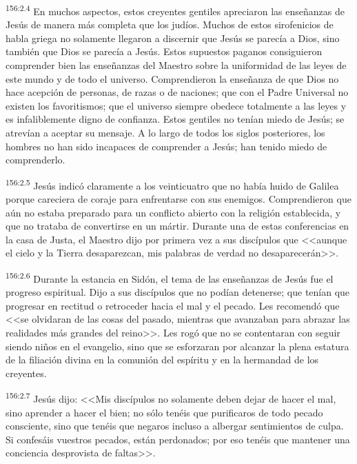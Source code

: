 \par 
\textsuperscript{156:2.4} En muchos aspectos, estos creyentes gentiles apreciaron las enseñanzas de Jesús de manera más completa que los judíos. Muchos de estos sirofenicios de habla griega no solamente llegaron a discernir que Jesús se parecía a Dios, sino también que Dios se parecía a Jesús. Estos supuestos paganos consiguieron comprender bien las enseñanzas del Maestro sobre la uniformidad de las leyes de este mundo y de todo el universo. Comprendieron la enseñanza de que Dios no hace acepción de personas, de razas o de naciones; que con el Padre Universal no existen los favoritismos; que el universo siempre obedece totalmente a las leyes y es infaliblemente digno de confianza. Estos gentiles no tenían miedo de Jesús; se atrevían a aceptar su mensaje. A lo largo de todos los siglos posteriores, los hombres no han sido incapaces de comprender a Jesús; han tenido miedo de comprenderlo.

\par 
\textsuperscript{156:2.5} Jesús indicó claramente a los veinticuatro que no había huido de Galilea porque careciera de coraje para enfrentarse con sus enemigos. Comprendieron que aún no estaba preparado para un conflicto abierto con la religión establecida, y que no trataba de convertirse en un mártir. Durante una de estas conferencias en la casa de Justa, el Maestro dijo por primera vez a sus discípulos que <<aunque el cielo y la Tierra desaparezcan, mis palabras de verdad no desaparecerán>>.

\par 
\textsuperscript{156:2.6} Durante la estancia en Sidón, el tema de las enseñanzas de Jesús fue el progreso espiritual. Dijo a sus discípulos que no podían detenerse; que tenían que progresar en rectitud o retroceder hacia el mal y el pecado. Les recomendó que <<se olvidaran de las cosas del pasado, mientras que avanzaban para abrazar las realidades más grandes del reino>>. Les rogó que no se contentaran con seguir siendo niños en el evangelio, sino que se esforzaran por alcanzar la plena estatura de la filiación divina en la comunión del espíritu y en la hermandad de los creyentes.

\par 
\textsuperscript{156:2.7} Jesús dijo: <<Mis discípulos no solamente deben dejar de hacer el mal, sino aprender a hacer el bien; no sólo tenéis que purificaros de todo pecado consciente, sino que tenéis que negaros incluso a albergar sentimientos de culpa. Si confesáis vuestros pecados, están perdonados; por eso tenéis que mantener una conciencia desprovista de faltas>>.

